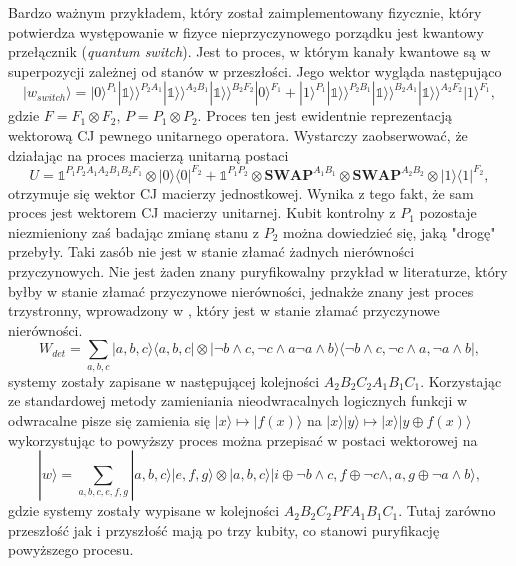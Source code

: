 \documentclass[10pt]{article} %
\newcommand{\Ket}[1]{|#1\rangle}
\newcommand{\Bra}[1]{\langle#1|}
\newcommand{\KKet}[1]{|#1\rangle\rangle}
\newcommand{\I}{\mathbb{1}}
\begin{document}
Bardzo ważnym przykładem, który został zaimplementowany fizycznie, który potwierdza występowanie w fizyce nieprzyczynowego porządku jest kwantowy przełącznik (\textit{quantum switch}). Jest to proces, w którym kanały kwantowe są w superpozycji zależnej od stanów w przeszłości. Jego wektor wygląda następująco
\begin{equation}
\Ket{w_{switch}} = \Ket{0}^{P_1}\KKet{\I}^{P_2A_1}\KKet{\I}^{A_2B_1}\KKet{\I}^{B_2F_2}\Ket{0}^{F_1}+\Ket{1}^{P_1}\KKet{\I}^{P_2B_1}\KKet{\I}^{B_2A_1}\KKet{\I}^{A_2F_2}\Ket{1}^{F_1},
\end{equation} gdzie $F = F_1 \otimes F_2$, $P = P_1 \otimes P_2$. Proces ten jest ewidentnie reprezentacją wektorową CJ pewnego unitarnego operatora. Wystarczy zaobserwować, że działając na proces macierzą unitarną postaci
\begin{equation}
U = \I^{P_1P_2A_1A_2B_1B_2F_1}\otimes\Ket{0}\Bra{0}^{F_2} + \I^{P_1P_2} \otimes \mathbf{SWAP}^{A_1B_1} \otimes \mathbf{SWAP}^{A_2B_2} \otimes \Ket{1}\Bra{1}^{F_2},
\end{equation}
otrzymuje się wektor CJ macierzy jednostkowej. Wynika z tego fakt, że sam proces jest wektorem CJ macierzy unitarnej.
Kubit kontrolny z $P_1$ pozostaje niezmieniony zaś badając zmianę stanu z $P_2$ można dowiedzieć się, jaką "drogę" przebyły. Taki zasób nie jest w stanie złamać żadnych nierówności przyczynowych.
Nie jest żaden znany puryfikowalny przykład w literaturze, który byłby w stanie złamać przyczynowe nierówności, jednakże znany jest proces trzystronny, wprowadzony w \cite{logic}, który jest w stanie złamać przyczynowe nierówności. 
\begin{equation}
W_{det} = \sum_{a,b,c} \Ket{a,b,c}\Bra{a,b,c} \otimes \Ket{\neg b \land c, \neg c\land a \neg a\land b} \Bra{\neg b \land c, \neg c\land a ,\neg a\land b},
\end{equation} systemy zostały zapisane w następującej kolejności $A_2B_2C_2A_1B_1C_1$. Korzystając ze standardowej metody zamieniania nieodwracalnych logicznych funkcji w odwracalne pisze się zamienia się
$\Ket{x} \mapsto \Ket{f(x)}$ na $\Ket{x}\Ket{y} \mapsto \Ket{x}\Ket{y \oplus f(x)}$ wykorzystując to powyższy proces można przepisać w postaci wektorowej na
\begin{equation}
\Ket{w} = \sum_{a,b,c,e,f,g} \Ket{a,b,c}\Ket{e,f,g} \otimes \Ket{a,b,c}\Ket{i \oplus \neg b \land c,f \oplus \neg c\land, a , g\oplus \neg a\land b},
\end{equation} gdzie systemy zostały wypisane w kolejności $A_2B_2C_2PFA_1B_1C_1$. Tutaj zarówno przeszłość jak i przyszłość mają po trzy kubity, co stanowi puryfikację powyższego procesu.
\end{document}
